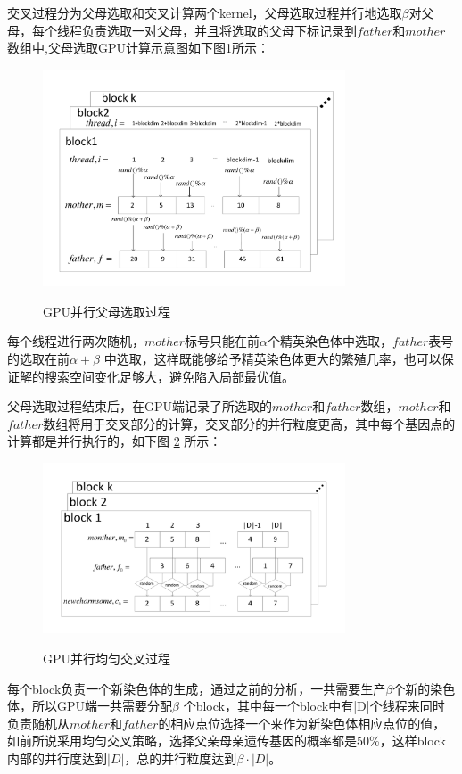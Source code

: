 交叉过程分为父母选取和交叉计算两个kernel，父母选取过程并行地选取$\beta$对父母，每个线程负责选取一对父母，并且将选取的父母下标记录到$father$和$mother$数组中,父母选取GPU计算示意图如下图\ref{pp}所示：
\begin{figure}
\begin{center}
{\includegraphics[width=0.8\textwidth]{figures/GPUchoose.pdf}}
\end{center}
\caption{{\footnotesize{GPU并行父母选取过程}}}
\label{pp}
\end{figure}
每个线程进行两次随机，$mother$标号只能在前$\alpha$个精英染色体中选取，$father$表号的选取在前$\alpha+\beta$ 中选取，这样既能够给予精英染色体更大的繁殖几率，也可以保证解的搜索空间变化足够大，避免陷入局部最优值。

父母选取过程结束后，在GPU端记录了所选取的$mother$和$father$数组，$mother$和$father$数组将用于交叉部分的计算，交叉部分的并行粒度更高，其中每个基因点的计算都是并行执行的，如下图 \ref{cross} 所示：
\begin{figure}
\begin{center}
{\includegraphics[width=0.8\textwidth]{figures/GPUcross.pdf}}
\end{center}
\caption{{\footnotesize{GPU并行均匀交叉过程}}}
\label{cross}
\end{figure}
每个block负责一个新染色体的生成，通过之前的分析，一共需要生产$\beta$个新的染色体，所以GPU端一共需要分配$\beta$ 个block，其中每一个block中有|D|个线程来同时负责随机从$mother$和$father$的相应点位选择一个来作为新染色体相应点位的值，如前所说采用均匀交叉策略，选择父亲母亲遗传基因的概率都是50\%，这样block内部的并行度达到$|D|$，总的并行粒度达到$\beta \cdot |D|$。

